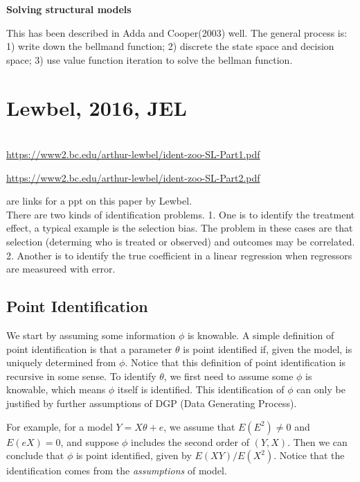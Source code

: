 \documentclass{book}
\theoremstyle{plain}
\theoremstyle{definition}
\begin{document}
\textbf{Solving structural models}

This has been described in Adda and Cooper(2003) well. 
The general process is: 
1) write down the bellmand function;
2) discrete the state space and decision space;
3) use value function iteration to solve the bellman function.




\section{Lewbel, 2016, JEL} %
\label{sec:lewbel_2016_jel}

\textbf{}\\

\url{https://www2.bc.edu/arthur-lewbel/ident-zoo-SL-Part1.pdf} 

\url{https://www2.bc.edu/arthur-lewbel/ident-zoo-SL-Part2.pdf}

are links for a ppt on this paper by Lewbel.\\

There are two kinds of identification problems. 
1. One is to identify the treatment effect, a typical example is the selection bias. The problem in these cases are that selection (determing who is treated or observed) and outcomes may be correlated. 
2. Another is to identify the true coefficient in a linear regression when regressors are measureed with error.

\subsection{Point Identification} %
\label{sub:point_identification}

We start by assuming some information $\phi$ is knowable. A simple definition of point identification is that a parameter $\theta$ is point identified if, given the model, is uniquely determined from $\phi$. Notice that this definition of point identification is recursive in some sense. To identify $\theta$, we first need to assume some $\phi$ is knowable, which means $\phi$ itself is identified. This identification of $\phi$ can only be justified by further assumptions of DGP (Data Generating Process).

For example, for a model $Y = X\theta +e$, we assume that $E(E^2)\ne0$ and $E(eX)=0$, and suppose $\phi$ includes the second order of $(Y,X)$. Then we can conclude that $\phi$ is point identified, given by $E(XY)/E(X^2)$. Notice that the identification comes from the \textit{assumptions} of model.
\end{document}

